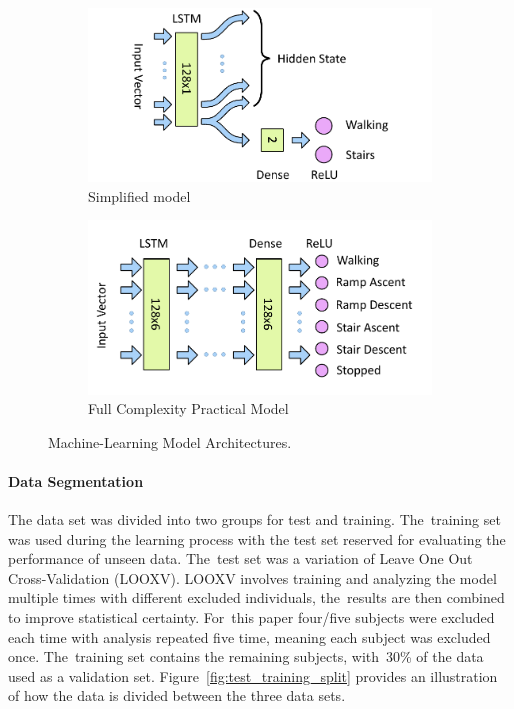 \begin{figure}[!hbt]
    \centering
        \begin{subfigure}[H]{0.49\textwidth}
    \centering
        \includegraphics[width=\textwidth]{content/4-LSTM_Behaviour/lstm/Simplified_Network.pdf}
        \caption{Simplified model}
        \label{subfig:simplfied_lstm_model}
    \end{subfigure}
       \vspace{3pt}
    \hfill
    \begin{subfigure}[H]{0.49\textwidth}
    \centering
        \includegraphics[width=\textwidth]{content/4-LSTM_Behaviour/lstm/LSTM_Network.pdf}
        \caption{Full Complexity Practical Model}
        \label{subfig:full_lstm_model}
    \end{subfigure}
    \vspace{3pt}
    \caption{Machine-Learning Model Architectures.}
    \label{fig:ml_models}
\end{figure}

\paragraph{Data Segmentation}
The data set was divided into two groups for test and training. The~training set was used during the learning process with the test set reserved for evaluating the performance of unseen data. The~test set was a variation of Leave One Out Cross-Validation (LOOXV). LOOXV involves training and analyzing the model multiple times with different excluded individuals, the~results are then combined to improve statistical certainty. For~this paper four/five subjects were excluded each time with analysis repeated five time, meaning each subject was excluded once. The~training set contains the remaining subjects, with~30\% of the data used as a validation set. Figure~\ref{fig:test_training_split} provides an illustration of how the data is divided between the three data sets.

